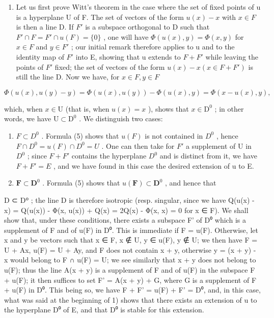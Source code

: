 \begin{enumerate}
\def\labelenumi{\arabic{enumi})}
\tightlist
\item
  Let us first prove Witt's theorem in the case where the set of fixed points of u is a hyperplane U of F. The set of vectors of the form \(u(x) - x\) with \(x \in F\) is then a line D. If \(F'\) is a subspace orthogonal to D such that \(F' \cap F = F' \cap u(F) = \{0\}\) , one will have \(\Phi(u(x), y) = \Phi(x, y)\) for \(x \in F\) and \(y \in F'\) ; our initial remark therefore applies to u and to the identity map of \(F'\) into E, showing that u extends to \(F + F'\) while leaving the points of \(F'\) fixed; the set of vectors of the form \(u(x) - x (x \in F + F')\) is still the line D. Now we have, for \(x \in F, y \in F\)
\end{enumerate}

\[
\Phi (u (x), u (y) - y) = \Phi (u (x), u (y)) - \Phi (u (x), y) = \Phi (x - u (x), y),
\]

which, when \(x \in \mathrm{U}\) (that is, when \(u(x) = x\) ), shows that \(x \in \mathrm{D}^0\) ; in other words, we have \(\mathrm{U} \subset \mathrm{D}^0\) . We distinguish two cases:

\begin{enumerate}
\def\labelenumi{\alph{enumi})}
\item
  \(F \subset D^{0}\) . Formula (5) shows that \(u(F)\) is not contained in \(D^{0}\) , hence \(F \cap D^{0} = u(F) \cap D^{0} = U\) . One can then take for \(F'\) a supplement of U in \(D^{0}\) ; since \(F + F'\) contains the hyperplane \(D^{0}\) and is distinct from it, we have \(F + F' = E\) , and we have found in this case the desired extension of u to E.
\item
  \(\mathbf{F} \subset \mathbf{D}^0\) . Formula (5) shows that \(u(\mathbf{F}) \subset \mathbf{D}^0\) , and hence that
\end{enumerate}

D ⊂ D⁰ ; the line D is therefore isotropic (resp. singular, since we have Q(u(x) - x) = Q(u(x)) - Φ(x, u(x)) + Q(x) = 2Q(x) - Φ(x, x) = 0 for x ∈ F). We shall show that, under these conditions, there exists a subspace F' of D⁰ which is a supplement of F and of u(F) in D⁰. This is immediate if F = u(F). Otherwise, let x and y be vectors such that x ∈ F, x ∉ U, y ∈ u(F), y ∉ U; we then have F = U + Ax, u(F) = U + Ay, and F does not contain x + y, otherwise y = (x + y) - x would belong to F ∩ u(F) = U; we see similarly that x + y does not belong to u(F); thus the line A(x + y) is a supplement of F and of u(F) in the subspace F + u(F); it then suffices to set F' = A(x + y) + G, where G is a supplement of F + u(F) in D⁰. This being so, we have F + F' = u(F) + F' = D⁰, and, in this case, what was said at the beginning of 1) shows that there exists an extension of u to the hyperplane D⁰ of E, and that D⁰ is stable for this extension.

